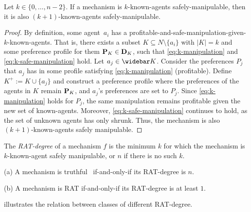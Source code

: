 \begin{propositionrep}
\label{prop:monotonicity}
    Let $k \in \{0, \ldots, n-2\}$.
    If a mechanism is $k$-known-agents safely-manipulable, then it is also $(k+1)$-known-agents safely-manipulable.
\end{propositionrep}
\begin{proof}
    By definition, some agent~$a_i$ has a profitable-and-safe-manipulation-given-$k$-known-agents. 
    That is, there exists a subset $K \subseteq N \setminus \{a_i\}$ with $|K| = k$ and some preference profile for them $\mathbf{P}_{K} \in \mathbf{D}_{K}$, such that \eqref{eq:k-manipulation} and \eqref{eq:k-safe-manipulation} hold.
    Let $a_j \in \notK$.
    Consider the preferences $P_j$ that $a_j$ has in some profile satisfying \eqref{eq:k-manipulation} (profitable). 
    Define  $K^+ := K \cup \{a_j\}$ and construct a preference profile where the preferences of the agents in $K$ remain $\mathbf{P}_{K}$, and $a_j$'s preferences are set to $P_j$.
    Since \eqref{eq:k-manipulation} holds for $P_j$, the same manipulation remains profitable given the new set of known-agents.
    Moreover, \eqref{eq:k-safe-manipulation} continues to hold, as the set of unknown agents has only shrunk.
    Thus, the mechanism is also $(k+1)$-known-agents safely manipulable.
\end{proof}

\begin{definition}%
    The \emph{RAT-degree} of a mechanism $f$ is the minimum $k$ for which the mechanism is $k$-known-agent safely manipulable, or $n$ if there is no such $k$.
\end{definition}

\begin{observation}
(a) A mechanism is truthful~ if-and-only-if its RAT-degree is $n$.

(b) A mechanism is RAT if-and-only-if its RAT-degree is at least $1$.
\end{observation}


 illustrates the relation between classes of different RAT-degree. 


